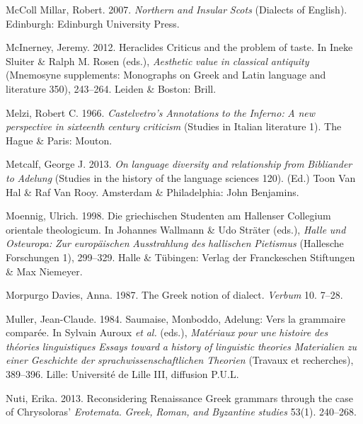 McColl Millar, Robert. 2007. \textit{Northern} \textit{and} \textit{Insular} \textit{Scots} (Dialects of English). Edinburgh: Edinburgh University Press.

McInerney, Jeremy. 2012. Heraclides Criticus and the problem of taste. In Ineke Sluiter \& Ralph M. Rosen (eds.), \textit{Aesthetic} \textit{value} \textit{in} \textit{classical} \textit{antiquity} (Mnemosyne supplements: Monographs on Greek and Latin language and literature 350), 243–264. Leiden \& Boston: Brill.

Melzi, Robert C. 1966. \textit{Castelvetro’s} \textit{Annotations} \textit{to} \textit{the} \textit{Inferno:} \textit{A} \textit{new} \textit{perspective} \textit{in} \textit{sixteenth} \textit{century} \textit{criticism} (Studies in Italian literature 1). The Hague \& Paris: Mouton.

Metcalf, George J. 2013. \textit{On} \textit{language} \textit{diversity} \textit{and} \textit{relationship} \textit{from} \textit{Bibliander} \textit{to} \textit{Adelung} (Studies in the history of the language sciences 120). (Ed.) Toon Van Hal \& Raf Van Rooy. Amsterdam \& Philadelphia: John Benjamins.

Moennig, Ulrich. 1998. Die griechischen Studenten am Hallenser Collegium orientale theologicum. In Johannes Wallmann \& Udo Sträter (eds.), \textit{Halle} \textit{und} \textit{Osteuropa:} \textit{Zur} \textit{europäischen} \textit{Ausstrahlung} \textit{des} \textit{hallischen} \textit{Pietismus} (Hallesche Forschungen 1), 299–329. Halle \& Tübingen: Verlag der Franckeschen Stiftungen \& Max Niemeyer.

Morpurgo Davies, Anna. 1987. The Greek notion of dialect. \textit{Verbum} 10. 7–28.

Muller, Jean-Claude. 1984. Saumaise, Monboddo, Adelung: Vers la grammaire comparée. In Sylvain Auroux \textit{et} \textit{al.} (eds.), \textit{Matériaux} \textit{pour} \textit{une} \textit{histoire} \textit{des} \textit{théories} \textit{linguistiques} {\textbar} \textit{Essays} \textit{toward} \textit{a} \textit{history} \textit{of} \textit{linguistic} \textit{theories} {\textbar} \textit{Materialien} \textit{zu} \textit{einer} \textit{Geschichte} \textit{der} \textit{sprachwissenschaftlichen} \textit{Theorien} (Travaux et recherches), 389–396. Lille: Université de Lille III, diffusion P.U.L.

Nuti, Erika. 2013. Reconsidering Renaissance Greek grammars through the case of Chrysoloras’ \textit{Erotemata}. \textit{Greek,} \textit{Roman,} \textit{and} \textit{Byzantine} \textit{studies} 53(1). 240–268.

